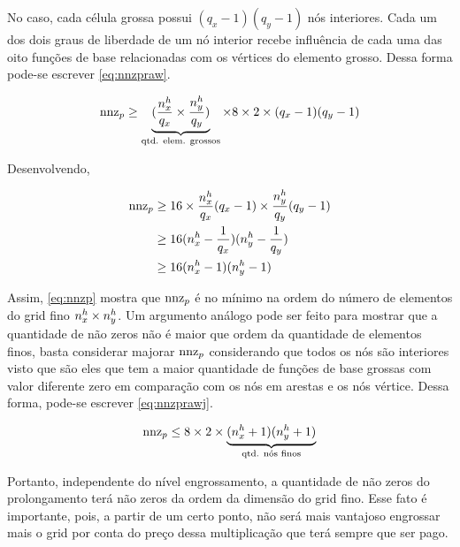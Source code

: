 No caso, cada célula grossa possui $(q_x-1)(q_y-1)$ nós interiores. Cada um dos dois graus de liberdade de um nó interior recebe influência de cada uma das oito funções de base relacionadas com os vértices do elemento grosso. Dessa forma pode-se escrever \eqref{eq:nnzpraw}.

\begin{equation} \label{eq:nnzpraw}
    \text{nnz}_p \ge  \underbrace{(\frac{n^h_x}{q_x} \times \frac{n^h_y}{q_y})}_{\text{qtd. elem. grossos}} \times 8 \times 2 \times (q_x-1)(q_y-1)
\end{equation}

Desenvolvendo,

\begin{align}
     \text{nnz}_p   & \ge  16 \times  \frac{n^h_x}{q_x} (q_x-1) \times \frac{n^h_y}{q_y} (q_y-1) \nonumber  \\
                & \ge  16   (n^h_x - \frac{1}{q_x})  (n^h_y - \frac{1}{q_y}) \nonumber   \\
                & \ge  16   (n^h_x - 1)  (n^h_y - 1) \label{eq:nnzp}
\end{align}

Assim, \eqref{eq:nnzp} mostra que $\text{nnz}_p$ é no mínimo na ordem do número de elementos do grid fino $n^h_x\times n^h_y$. Um argumento análogo pode ser feito para mostrar que a quantidade de não zeros não é maior que ordem da quantidade de elementos finos, basta considerar majorar $\text{nnz}_p$ considerando que todos os nós são interiores visto que são eles que tem a maior quantidade de funções de base grossas com valor diferente zero em comparação com os nós em arestas e os nós vértice. Dessa forma, pode-se escrever \eqref{eq:nnzprawj}.

\begin{equation}\label{eq:nnzprawj}
    \text{nnz}_p \le 8 \times 2 \times \underbrace{(n^h_x + 1)(n^h_y + 1)}_{\text{qtd. nós finos}}
\end{equation}


Portanto, independente do nível engrossamento, a quantidade de não zeros do prolongamento terá não zeros da ordem da dimensão do grid fino. Esse fato é importante, pois, a partir de um certo ponto, não será mais vantajoso engrossar mais o grid por conta do preço dessa multiplicação  que terá sempre que ser pago.